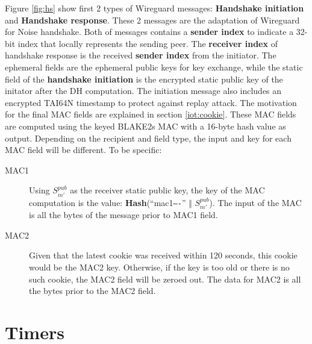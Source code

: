     Figure \ref{fig:hs} show first 2 types of Wireguard messages: \textbf{Handshake initiation} and
    \textbf{Handshake response}. These 2 messages are the adaptation of Wireguard for Noise
    handshake. Both of messages contains a \textbf{sender index} to indicate a 32-bit index
    that locally represents the sending peer. The \textbf{receiver index} of handshake response
    is the received \textbf{sender index} from the initiator. The ephemeral fields are the
    ephemeral public keys for key exchange, while the static field of the \textbf{handshake initiation}
    is the encrypted static public key of the initator after the DH computation. The initiation message
    also includes an encrypted TAI64N \cite{tai64} timestamp to protect against replay attack. The motivation
    for the final MAC fields are explained in section \ref{iot:cookie}. These MAC fields are computed
    using the keyed BLAKE2s MAC with a 16-byte hash value as output. Depending on the recipient and
    field type, the input and key for each MAC field will be different. To be specific:
      \begin{description}
        \item[MAC1] Using $S^{pub}_{m'}$ as the receiver static public key, the key of the MAC computation
        is the value: \textbf{Hash}(``mac1\texttt{----}'' $\Vert$ $S^{pub}_{m'}$). The input of the MAC is all
        the bytes of the message prior to MAC1 field.
        \item[MAC2] Given that the latest cookie was received within 120 seconds, this cookie
        would be the MAC2 key. Otherwise, if the key is too old or there is no such cookie, the MAC2 
        field will be zeroed out. The data for MAC2 is all the bytes prior to the MAC2 field.
      \end{description}
    
    

\section{Timers} \label{w4}